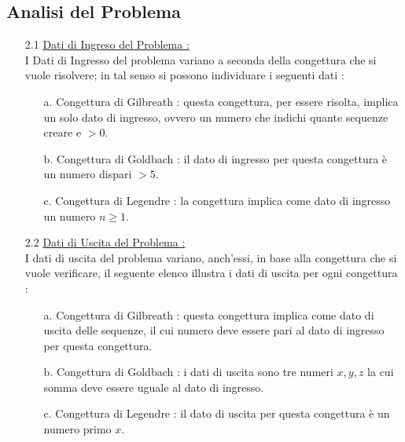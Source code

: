 \documentclass{article}
\begin{document}
\newpage
\begin{center}
    \section{Analisi del Problema}
\end{center}
\begin{enumerate}
    \Large
    \item[2.1] \underline{Dati di Ingreso del Problema :} 
    \large\\I Dati di Ingresso del problema variano a seconda della congettura che si vuole risolvere; in tal senso si possono individuare i seguenti dati : 
    \begin{enumerate}
        \item[a.] Congettura di Gilbreath : questa congettura, per essere risolta, implica un solo dato di ingresso, ovvero un numero che indichi quante sequenze creare e \begin{math} > 0\end{math}.
        \item[b.] Congettura di Goldbach : il dato di ingresso per questa congettura è un numero dispari \begin{math} > 5\end{math}.
        \item[c.] Congettura di Legendre : la congettura implica come dato di ingresso un numero \begin{math} n \geq 1\end{math}.
    \end{enumerate}
    \Large\item[2.2] \underline{Dati di Uscita del Problema : }
    \large \\I dati di uscita del problema variano, anch'essi, in base alla congettura che si vuole verificare, il seguente elenco illustra i dati di uscita per ogni congettura : 
    \begin{enumerate}
        \item[a.] Congettura di Gilbreath : questa congettura implica come dato di uscita delle sequenze, il cui numero deve essere pari al dato di ingresso per questa congettura. 
        \item[b.] Congettura di Goldbach : i dati di uscita sono tre numeri \begin{math} x, y, z\end{math} la cui somma deve essere uguale al dato di ingresso.
        \item[c.] Congettura di Legendre : il dato di uscita per questa congettura è un numero primo \begin{math} x\end{math}.

\end{enumerate}
\end{enumerate}
\end{document}
